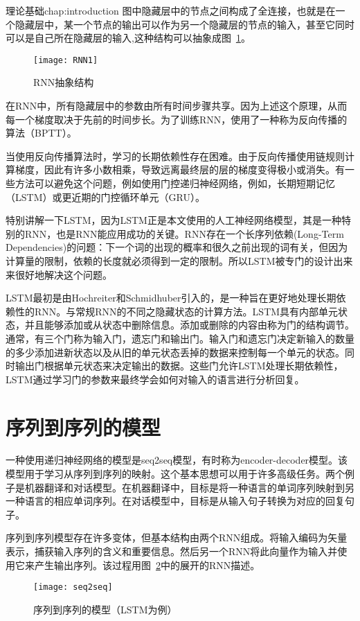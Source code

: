 \begin{cuzchapter}{理论基础}{chap:introduction}
图中隐藏层中的节点之间构成了全连接，也就是在一个隐藏层中，某一个节点的输出可以作为另一个隐藏层的节点的输入，甚至它同时可以是自己所在隐藏层的输入,这种结构可以抽象成图~\ref{RNN1}。
\begin{figure}[!htbp]
    \centering
    \texttt{[image: RNN1]}
    \caption[RNN1]{RNN抽象结构}
    \label{RNN1}
\end{figure}

在RNN中，所有隐藏层中的参数由所有时间步骤共享。因为上述这个原理，从而每一个梯度取决于先前的时间步长。为了训练RNN，使用了一种称为反向传播的算法（BPTT）。

当使用反向传播算法时，学习的长期依赖性存在困难\cite{279181}。由于反向传播使用链规则计算梯度，因此有许多小数相乘，导致远离最终层的层的梯度变得极小或消失。有一些方法可以避免这个问题，例如使用门控递归神经网络，例如，长期短期记忆（LSTM）\cite{Graves2012Long}或更近期的门控循环单元（GRU）\cite{DBLP:journals/corr/ChoMGBSB14}。 

特别讲解一下LSTM，因为LSTM正是本文使用的人工神经网络模型，其是一种特别的RNN，也是RNN能应用成功的关键。RNN存在一个长序列依赖(Long-Term Dependencies)的问题：下一个词的出现的概率和很久之前出现的词有关，但因为计算量的限制，依赖的长度就必须得到一定的限制。所以LSTM被专门的设计出来来很好地解决这个问题。

LSTM最初是由Hochreiter和Schmidhuber引入的\cite{Graves2012Long}，是一种旨在更好地处理长期依赖性的RNN。与常规RNN的不同之隐藏状态的计算方法。LSTM具有内部单元状态，并且能够添加或从状态中删除信息。添加或删除的内容由称为门的结构调节。通常，有三个门称为输入门，遗忘门和输出门。输入门和遗忘门决定新输入的数量的多少添加进新状态以及从旧的单元状态丢掉的数据来控制每一个单元的状态。同时输出门根据单元状态来决定输出的数据。这些门允许LSTM处理长期依赖性，LSTM通过学习门的参数来最终学会如何对输入的语言进行分析回复。
\section{序列到序列的模型}\label{sec:background}
一种使用递归神经网络的模型是seq2seq模型，有时称为encoder-decoder模型\cite{DBLP:journals/corr/ChoMGBSB14}。该模型用于学习从序列到序列的映射。这个基本思想可以用于许多高级任务。两个例子是机器翻译\cite{Sutskever2014Sequence}和对话模型\cite{DBLP:journals/corr/VinyalsL15}。在机器翻译中，目标是将一种语言的单词序列映射到另一种语言的相应单词序列。在对话模型中，目标是从输入句子转换为对应的回复句子。

序列到序列模型存在许多变体，但基本结构由两个RNN组成。将输入编码为矢量表示，捕获输入序列的含义和重要信息。然后另一个RNN将此向量作为输入并使用它来产生输出序列。该过程用图~\ref{seq2seq}中的展开的RNN描述。
\begin{figure}[!htbp]
    \centering
    \texttt{[image: seq2seq]}
    \caption[seq2seq]{序列到序列的模型（LSTM为例）}
    \label{seq2seq}
\end{figure}



\end{cuzchapter}
